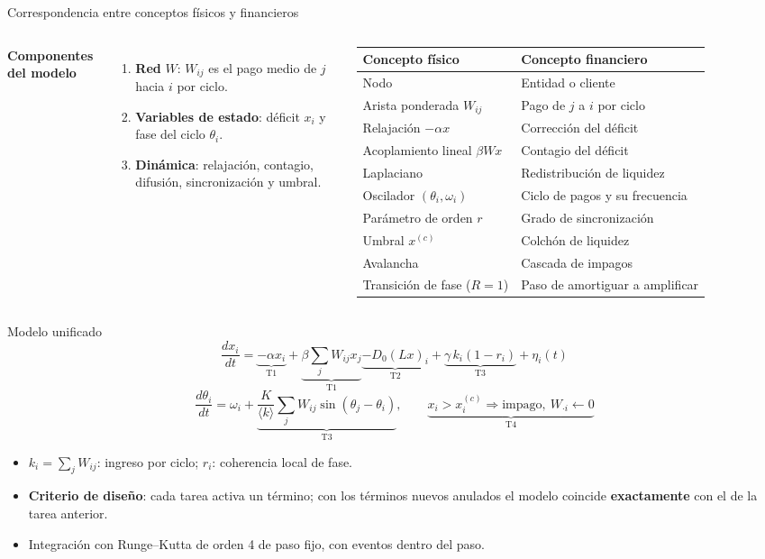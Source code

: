 \documentclass[aspectratio=169,10pt]{beamer}
\begin{document}
\begin{frame}{Correspondencia entre conceptos físicos y financieros}
\begin{columns}[T]
\textbf{Componentes del modelo}
\begin{enumerate}
\item \textbf{Red} $W$: $W_{ij}$ es el pago medio de $j$ hacia $i$ por ciclo.
\item \textbf{Variables de estado}: déficit $x_i$ y fase del ciclo $\theta_i$.
\item \textbf{Dinámica}: relajación, contagio, difusión, sincronización y umbral.
\end{enumerate}
\scriptsize
\begin{tabular}{ll}
\toprule
Concepto físico & Concepto financiero \\
\midrule
Nodo & Entidad o cliente \\
Arista ponderada $W_{ij}$ & Pago de $j$ a $i$ por ciclo \\
Relajación $-\alpha x$ & Corrección del déficit \\
Acoplamiento lineal $\beta Wx$ & Contagio del déficit \\
Laplaciano & Redistribución de liquidez \\
Oscilador $(\theta_i,\omega_i)$ & Ciclo de pagos y su frecuencia \\
Parámetro de orden $r$ & Grado de sincronización \\
Umbral $x^{(c)}$ & Colchón de liquidez \\
Avalancha & Cascada de impagos \\
Transición de fase ($R=1$) & Paso de amortiguar a amplificar \\
\bottomrule
\end{tabular}
\end{columns}
\end{frame}

\begin{frame}{Modelo unificado}
\[
\frac{dx_i}{dt} = \underbrace{-\alpha x_i}_{\text{T1}}
+ \underbrace{\beta\sum_j W_{ij}x_j}_{\text{T1}}
\underbrace{- D_0(Lx)_i}_{\text{T2}}
+ \underbrace{\gamma\,k_i(1-r_i)}_{\text{T3}} + \eta_i(t)
\]
\[
\frac{d\theta_i}{dt} = \omega_i + \underbrace{\frac{K}{\langle k\rangle}\sum_j W_{ij}\sin(\theta_j-\theta_i)}_{\text{T3}},
\qquad \underbrace{x_i > x_i^{(c)} \Rightarrow \text{impago},\ W_{\cdot i}\leftarrow 0}_{\text{T4}}
\]
\begin{itemize}
\item $k_i=\sum_jW_{ij}$: ingreso por ciclo; $r_i$: coherencia local de fase.
\item \textbf{Criterio de diseño}: cada tarea activa un término; con los términos nuevos
anulados el modelo coincide \textbf{exactamente} con el de la tarea anterior.
\item Integración con Runge–Kutta de orden 4 de paso fijo, con eventos dentro del paso.
\end{itemize}
\end{frame}
\end{document}
